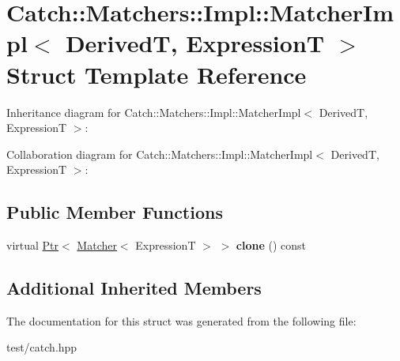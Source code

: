 \hypertarget{structCatch_1_1Matchers_1_1Impl_1_1MatcherImpl}{}\section{Catch\+:\+:Matchers\+:\+:Impl\+:\+:Matcher\+Impl$<$ DerivedT, ExpressionT $>$ Struct Template Reference}
\label{structCatch_1_1Matchers_1_1Impl_1_1MatcherImpl}


Inheritance diagram for Catch\+:\+:Matchers\+:\+:Impl\+:\+:Matcher\+Impl$<$ DerivedT, ExpressionT $>$\+:


Collaboration diagram for Catch\+:\+:Matchers\+:\+:Impl\+:\+:Matcher\+Impl$<$ DerivedT, ExpressionT $>$\+:
\subsection*{Public Member Functions}
\begin{DoxyCompactItemize}
\item 
virtual \hyperlink{classCatch_1_1Ptr}{Ptr}$<$ \hyperlink{structCatch_1_1Matchers_1_1Impl_1_1Matcher}{Matcher}$<$ ExpressionT $>$ $>$ {\bfseries clone} () const \hypertarget{structCatch_1_1Matchers_1_1Impl_1_1MatcherImpl_afe2e10779f91394f80ff5c894fb1bfab}{}\label{structCatch_1_1Matchers_1_1Impl_1_1MatcherImpl_afe2e10779f91394f80ff5c894fb1bfab}

\end{DoxyCompactItemize}
\subsection*{Additional Inherited Members}


The documentation for this struct was generated from the following file\+:\begin{DoxyCompactItemize}
\item 
test/catch.\+hpp\end{DoxyCompactItemize}
